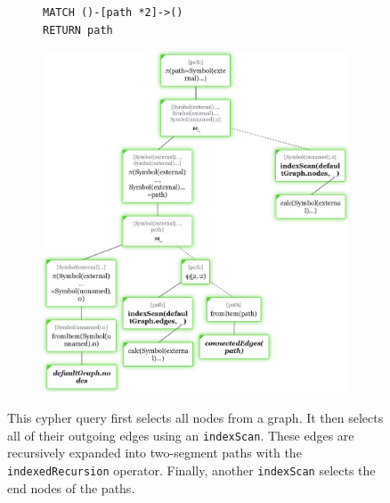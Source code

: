 \begin{figure}[htpb]
    \begin{subfigure}[b]{\textwidth}
    \begin{tcolorbox}[colback=white, colframe=black, boxrule=1pt, arc=0pt]
        \begin{verbatim}
MATCH ()-[path *2]->()
RETURN path
        \end{verbatim}
    \end{tcolorbox}
    \end{subfigure}

    \medskip
    
    \begin{subfigure}{\textwidth}
        \centering
        \includegraphics[width=\textwidth]{img/tree-indexed-recursion.png}
    \end{subfigure}
    
    \caption{This cypher query first selects all nodes from a graph. It then selects all of their outgoing edges using an \texttt{indexScan}. These edges are recursively expanded into two-segment paths with the \texttt{indexedRecursion} operator. Finally, another \texttt{indexScan} selects the end nodes of the paths.}
    \label{fig:tree-indexed-recursion}
\end{figure}